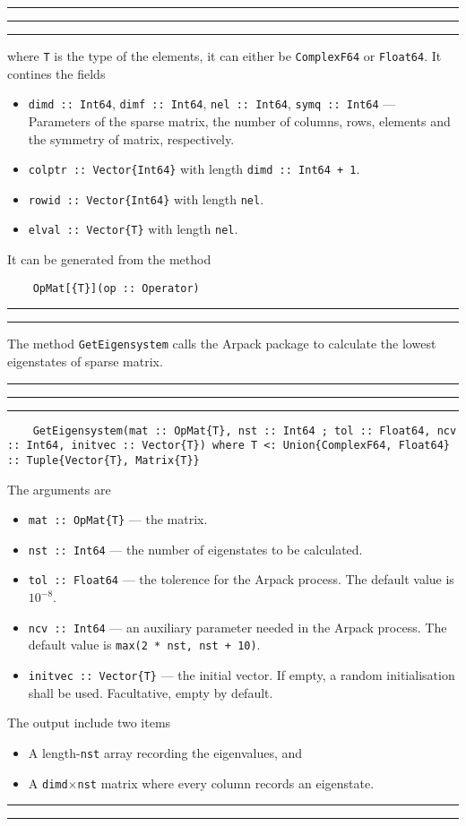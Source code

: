 \documentclass{timesjhep}
\newenvironment{block}[1]{\vspace{0.4\baselineskip}\hrule\vspace{0.10\baselineskip}\hrule\vspace{0.30\baselineskip}{\bfseries #1}\vspace{0.2\baselineskip}\hrule\vspace{0.3\baselineskip}
}{\vspace{0.2\baselineskip}\hrule\vspace{0.10\baselineskip}\hrule\vspace{0.5\baselineskip}}
\begin{document}
\begin{block}{\lstinline|OpMat{T}| --- Type}
\noindent where \lstinline|T| is the type of the elements, it can either be \lstinline|ComplexF64| or \lstinline|Float64|. It contines the fields
\begin{itemize}
    \item \lstinline|dimd :: Int64|, \lstinline|dimf :: Int64|, \lstinline|nel :: Int64|, \lstinline|symq :: Int64| --- Parameters of the sparse matrix, the number of columns, rows, elements and the symmetry of matrix, respectively.
    \item \lstinline|colptr :: Vector{Int64}| with length \lstinline|dimd :: Int64 + 1|.
    \item \lstinline|rowid :: Vector{Int64}| with length \lstinline|nel|.
    \item \lstinline|elval :: Vector{T}| with length \lstinline|nel|.
\end{itemize}
It can be generated from the method
\begin{lstlisting}
    OpMat[{T}](op :: Operator)
\end{lstlisting}
\end{block}

The method \lstinline|GetEigensystem| calls the Arpack package to calculate the lowest eigenstates of sparse matrix. 

\begin{block}{\lstinline|GetEigensystem| --- Method}
\begin{lstlisting}
    GetEigensystem(mat :: OpMat{T}, nst :: Int64 ; tol :: Float64, ncv :: Int64, initvec :: Vector{T}) where T <: Union{ComplexF64, Float64} :: Tuple{Vector{T}, Matrix{T}}
\end{lstlisting}
The arguments are 
\begin{itemize}
    \item \lstinline|mat :: OpMat{T}| --- the matrix.
    \item \lstinline|nst :: Int64| --- the number of eigenstates to be calculated.
    \item \lstinline|tol :: Float64| --- the tolerence for the Arpack process. The default value is $10^{-8}$.
    \item \lstinline|ncv :: Int64| --- an auxiliary parameter needed in the Arpack process. The default value is \lstinline|max(2 * nst, nst + 10)|.
    \item \lstinline|initvec :: Vector{T}| --- the initial vector. If empty, a random initialisation shall be used. Facultative, empty by default.  
\end{itemize}
The output include two items
\begin{itemize}
    \item A length-\lstinline|nst| array recording the eigenvalues, and 
    \item A \lstinline|dimd|$\times$\lstinline|nst| matrix where every column records an eigenstate. 
\end{itemize}

\end{block}
\end{document}
